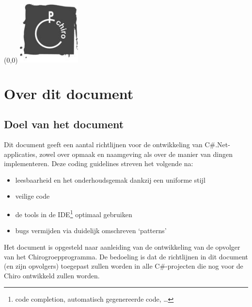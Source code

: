 \documentclass[a4paper,11pt]{article}
\begin{document}
\lstset{language=[Sharp]C, tabsize=3, frame=single, basicstyle=\small, texcl=true}


\begin{textblock}{2}(0,0)
\includegraphics[height=32mm]{chiro-grijs.jpg} \\
\end{textblock}


\vspace*{4mm}




\tableofcontents

\section{Over dit document}

\subsection{Doel van het document}

Dit document geeft een aantal richtlijnen voor de ontwikkeling van
C\#.Net-applicaties, zowel over opmaak en naamgeving als over de manier van
dingen implementeren.  Deze coding guidelines streven het volgende na:
\begin{itemize}
\item leesbaarheid en het onderhoudsgemak dankzij een uniforme stijl
\item veilige code
\item de tools in de IDE\footnote{code completion, automatisch
gegenereerde code, \ldots} optimaal gebruiken
\item bugs vermijden via duidelijk omschreven `patterns'
\end{itemize}
Het document is opgesteld naar aanleiding van de ontwikkeling van de
opvolger van het Chirogroepprogramma.
De bedoeling is dat de richtlijnen in dit document (en zijn opvolgers) toegepast zullen worden
in alle C\#-projecten die nog voor de Chiro ontwikkeld zullen worden.
\end{document}

